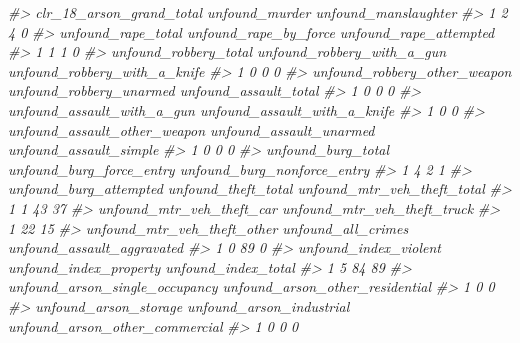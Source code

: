 \documentclass[
]{krantz}
\makeatletter
\newenvironment{Shaded}{\begin{snugshade}}{\end{snugshade}}
\newcommand{\CommentTok}[1]{\textcolor[rgb]{0.37,0.37,0.37}{\textit{#1}}}
\newenvironment{kframe}{%
\medskip{}
\setlength{\fboxsep}{.8em}
 \def\at@end@of@kframe{}%
 \ifinner\ifhmode%
  \def\at@end@of@kframe{\end{minipage}}%
  \begin{minipage}{\columnwidth}%
 \fi\fi%
 \def\FrameCommand##1{\hskip\@totalleftmargin \hskip-\fboxsep
 \colorbox{shadecolor}{##1}\hskip-\fboxsep
     \hskip-\linewidth \hskip-\@totalleftmargin \hskip\columnwidth}%
 \MakeFramed {\advance\hsize-\width
   \@totalleftmargin\z@ \linewidth\hsize
   \@setminipage}}%
 {\par\unskip\endMakeFramed%
 \at@end@of@kframe}
\renewenvironment{Shaded}{\begin{kframe}}{\end{kframe}}
\makeatother
\begin{document}
\begin{Shaded}
\begin{Highlighting}[]
\CommentTok{\#\textgreater{}   clr\_18\_arson\_grand\_total unfound\_murder unfound\_manslaughter}
\CommentTok{\#\textgreater{} 1                        2              4                    0}
\CommentTok{\#\textgreater{}   unfound\_rape\_total unfound\_rape\_by\_force unfound\_rape\_attempted}
\CommentTok{\#\textgreater{} 1                  1                     1                      0}
\CommentTok{\#\textgreater{}   unfound\_robbery\_total unfound\_robbery\_with\_a\_gun unfound\_robbery\_with\_a\_knife}
\CommentTok{\#\textgreater{} 1                     0                          0                            0}
\CommentTok{\#\textgreater{}   unfound\_robbery\_other\_weapon unfound\_robbery\_unarmed unfound\_assault\_total}
\CommentTok{\#\textgreater{} 1                            0                       0                     0}
\CommentTok{\#\textgreater{}   unfound\_assault\_with\_a\_gun unfound\_assault\_with\_a\_knife}
\CommentTok{\#\textgreater{} 1                          0                            0}
\CommentTok{\#\textgreater{}   unfound\_assault\_other\_weapon unfound\_assault\_unarmed unfound\_assault\_simple}
\CommentTok{\#\textgreater{} 1                            0                       0                      0}
\CommentTok{\#\textgreater{}   unfound\_burg\_total unfound\_burg\_force\_entry unfound\_burg\_nonforce\_entry}
\CommentTok{\#\textgreater{} 1                  4                        2                           1}
\CommentTok{\#\textgreater{}   unfound\_burg\_attempted unfound\_theft\_total unfound\_mtr\_veh\_theft\_total}
\CommentTok{\#\textgreater{} 1                      1                  43                          37}
\CommentTok{\#\textgreater{}   unfound\_mtr\_veh\_theft\_car unfound\_mtr\_veh\_theft\_truck}
\CommentTok{\#\textgreater{} 1                        22                          15}
\CommentTok{\#\textgreater{}   unfound\_mtr\_veh\_theft\_other unfound\_all\_crimes unfound\_assault\_aggravated}
\CommentTok{\#\textgreater{} 1                           0                 89                          0}
\CommentTok{\#\textgreater{}   unfound\_index\_violent unfound\_index\_property unfound\_index\_total}
\CommentTok{\#\textgreater{} 1                     5                     84                  89}
\CommentTok{\#\textgreater{}   unfound\_arson\_single\_occupancy unfound\_arson\_other\_residential}
\CommentTok{\#\textgreater{} 1                              0                               0}
\CommentTok{\#\textgreater{}   unfound\_arson\_storage unfound\_arson\_industrial unfound\_arson\_other\_commercial}
\CommentTok{\#\textgreater{} 1                     0                        0                              0}

\end{Highlighting}
\end{Shaded}
\end{document}
